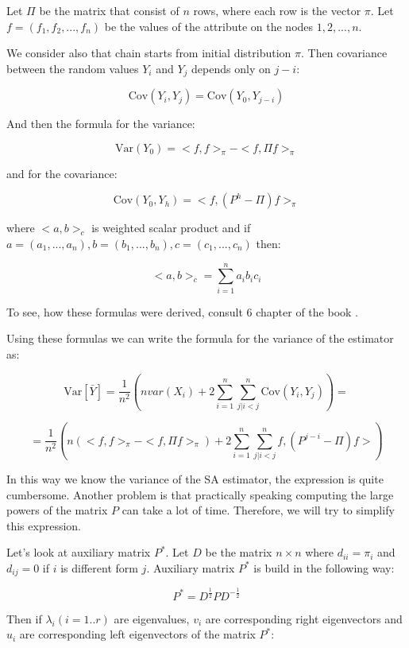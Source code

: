 \documentclass[12pt]{report}
\begin{document}
Let $\Pi$ be the matrix that consist of $n$ rows, where each row is the vector $\pi$. Let $f = (f_1 , f_2, ..., f_n)$ be the values of the attribute on the nodes $1, 2, ..., n$.

We consider also that chain starts from initial distribution $\pi$. Then covariance between the random values $Y_i$ and $Y_j$ depends only on $j-i$:

$$\mathrm{Cov}(Y_i, Y_j) = \mathrm{Cov} (Y_0, Y_{j-i})$$

And then the formula for the variance:

$$\mathrm{Var}(Y_0) = <f, f>_{\pi} - <f, \Pi f>_{\pi}$$

and for the covariance:

$$\mathrm{Cov}(Y_0, Y_h) = <f, (P^h - \Pi)f>_{\pi}$$

where $<a,b>_c$ is weighted scalar product and if $a = (a_1, ..., a_n), b = (b_1, ..., b_n), c = (c_1, ..., c_n)$ then:

$$<a,b>_c = \sum_{i = 1}^n a_i b_i c_i$$

To see, how these formulas were derived, consult 6 chapter of the book \cite{bremaud2013markov}.



Using these formulas we can write the formula for the variance of the estimator as:

$$ \mathrm{Var}\left[\bar{Y} \right] = \frac{1}{n^2} \left( nvar(X_i) + 2\sum_{i=1}^n \sum_{j|i < j}^n \mathrm{Cov}(Y_i, Y_j)\right) = $$

\begin{equation}\label{eq:varGen}
 = \frac{1}{n^2} \left( n(<f, f>_{\pi} - <f, \Pi f>_{\pi}) + 2\sum_{i=1}^n \sum_{j|i < j}^n  f, (P^{j-i} - \Pi)f> \right)
\end{equation}

In this way we know the variance of the SA estimator, the expression is quite cumbersome. Another problem is that practically speaking computing the large powers of the matrix $P$ can take a lot of time. Therefore, we will try to simplify this expression. 

Let's look at auxiliary matrix $P^*$. Let $D$ be the matrix $n \times n$ where $d_{ii} = \pi_i$ and $d_{ij} = 0$ if $i$ is different form $j$. Auxiliary matrix $P^*$ is build in the following way:

$$P^* = D^{\frac{1}{2}} P D^{-\frac{1}{2}}$$


Then if $\lambda_i (i=1..r)$ are eigenvalues, $v_i$ are corresponding right eigenvectors and $u_i$ are corresponding left eigenvectors of the matrix $P^*$:
\end{document}
